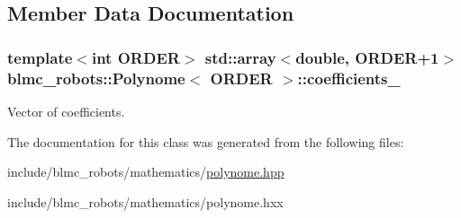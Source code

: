 \subsection{Member Data Documentation}
\subsubsection[{\texorpdfstring{coefficients\+\_\+}{coefficients_}}]{\setlength{\rightskip}{0pt plus 5cm}template$<$int O\+R\+D\+ER$>$ std\+::array$<$double, O\+R\+D\+ER+1$>$ {\bf blmc\+\_\+robots\+::\+Polynome}$<$ O\+R\+D\+ER $>$\+::coefficients\+\_\+\hspace{0.3cm}{\ttfamily [protected]}}\hypertarget{classblmc__robots_1_1Polynome_a0aa7d57743e14ed7f29f9b09509ce2e6}{}\label{classblmc__robots_1_1Polynome_a0aa7d57743e14ed7f29f9b09509ce2e6}
Vector of coefficients. 

The documentation for this class was generated from the following files\+:\begin{DoxyCompactItemize}
\item 
include/blmc\+\_\+robots/mathematics/\hyperlink{polynome_8hpp}{polynome.\+hpp}\item 
include/blmc\+\_\+robots/mathematics/polynome.\+hxx\end{DoxyCompactItemize}
